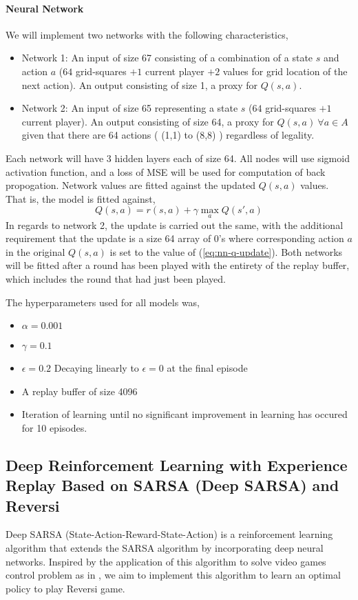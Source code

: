 \documentclass[../report.tex]{subfiles}
\begin{document}
\paragraph{Neural Network}
We will implement two networks with the following characteristics,
\begin{itemize}
    \item Network 1: An input of size 67 consisting of a combination of a state $s$ and action $a$ ($64$ grid-squares $+ 1$ current player $+ 2$ values for grid location of the next action). An output consisting of size 1, a proxy for $Q(s,a)$.
    \item Network 2: An input of size 65 representing a state $s$ ($64$ grid-squares $+ 1$ current player). An output consisting of size 64, a proxy for $Q(s,a)\:\forall a \in A$ given that there are 64 actions ( (1,1) to (8,8) ) regardless of legality.
\end{itemize}
Each network will have 3 hidden layers each of size 64. All nodes will use sigmoid activation function, and a loss of MSE will be used for computation of back propogation. Network values are fitted against the updated $Q(s,a)$ values. That is, the model is fitted against,
\begin{equation} \label{eq:nn-q-update}
    Q(s,a) = r(s,a) + \gamma \max_a Q(s',a)
\end{equation}
In regards to network 2, the update is carried out the same, with the additional requirement that the update is a size 64 array of 0's where corresponding action $a$ in the original $Q(s,a)$ is set to the value of (\ref{eq:nn-q-update}). Both networks will be fitted after a round has been played with the entirety of the replay buffer, which includes the round that had just been played.

The hyperparameters used for all models was,
\begin{itemize}
    \item $\alpha=0.001$
    \item $\gamma=0.1$
    \item $\epsilon=0.2$ Decaying linearly to $\epsilon=0$ at the final episode
    \item A replay buffer of size 4096
    \item Iteration of learning until no significant improvement in learning has occured for 10 episodes.
\end{itemize}

\subsection{Deep Reinforcement Learning with Experience Replay Based on SARSA (Deep SARSA) and Reversi}
Deep SARSA (State-Action-Reward-State-Action) is a reinforcement learning algorithm that extends the SARSA algorithm by incorporating deep neural networks. Inspired by the application of this algorithm to solve video games control problem as in \cite{7849837}, we aim to implement this algorithm to learn an optimal policy to play Reversi game.
\end{document}
